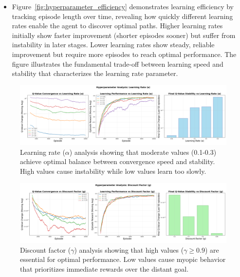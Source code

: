 \documentclass[11pt, a4paper]{article}
\begin{document}
\begin{itemize}
    \item Figure~\ref{fig:hyperparameter_efficiency} demonstrates learning efficiency by tracking episode length over time, revealing how quickly different learning rates enable the agent to discover optimal paths. Higher learning rates initially show faster improvement (shorter episodes sooner) but suffer from instability in later stages. Lower learning rates show steady, reliable improvement but require more episodes to reach optimal performance. The figure illustrates the fundamental trade-off between learning speed and stability that characterizes the learning rate parameter.
\end{itemize}

\begin{figure}[H]
    \centering
    \includegraphics[width=\textwidth]{images/hyperparameter_analysis_alpha.png}
    \caption{Learning rate ($\alpha$) analysis showing that moderate values (0.1-0.3) achieve optimal balance between convergence speed and stability. High values cause instability while low values learn too slowly.}\label{fig:hyperparameter_alpha}
\end{figure}

\begin{figure}[H]
    \centering
    \includegraphics[width=\textwidth]{images/hyperparameter_analysis_gamma.png}
    \caption{Discount factor ($\gamma$) analysis showing that high values ($\gamma \geq 0.9$) are essential for optimal performance. Low values cause myopic behavior that prioritizes immediate rewards over the distant goal.}\label{fig:hyperparameter_gamma}
\end{figure}
\end{document}
